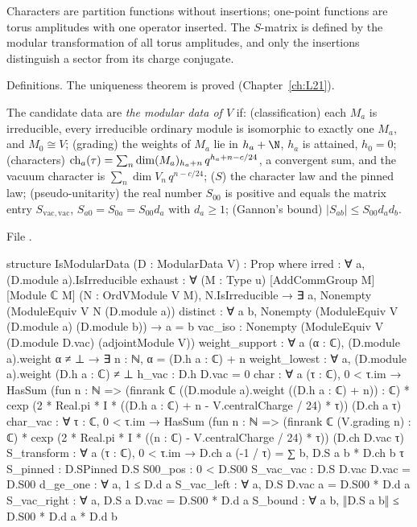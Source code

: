\begin{physics}
Characters are partition functions without insertions; one-point functions are torus amplitudes with one
operator inserted. The $S$-matrix is defined by the modular transformation of all torus amplitudes, and only
the insertions distinguish a sector from its charge conjugate.
\end{physics}

\begin{status}
Definitions. The uniqueness theorem is proved (Chapter~\ref{ch:L21}).
\end{status}

\begin{definition}\label{l22:def:ismoddata}
The candidate data are \emph{the modular data of $V$} if: (classification) each $M_a$ is irreducible, every
irreducible ordinary module is isomorphic to exactly one $M_a$, and $M_0\cong V$; (grading) the weights of $M_a$
lie in $h_a+\N$, $h_a$ is attained, $h_0=0$; (characters) $\operatorname{ch}_a(\tau)=\sum_n \dim(M_a)_{h_a+n}\,
q^{h_a+n-c/24}$, a convergent sum, and the vacuum character is $\sum_n\dim V_n\,q^{n-c/24}$; ($S$) the
character law and the pinned law; (pseudo-unitarity) the real number $S_{00}$ is positive and equals the matrix entry $S_{\mathrm{vac},\mathrm{vac}}$,
$S_{a0}=S_{0a}=S_{00}d_a$ with
$d_a\ge1$; (Gannon's bound) $|S_{ab}|\le S_{00}d_ad_b$.
\end{definition}
\noindent File .
\begin{leancode}
structure IsModularData (D : ModularData V) : Prop where
  irred : ∀ a, (D.module a).IsIrreducible
  exhaust : ∀ (M : Type u) [AddCommGroup M] [Module ℂ M] (N : OrdVModule V M),
    N.IsIrreducible → ∃ a, Nonempty (ModuleEquiv V N (D.module a))
  distinct : ∀ a b, Nonempty (ModuleEquiv V (D.module a) (D.module b)) → a = b
  vac_iso : Nonempty (ModuleEquiv V (D.module D.vac) (adjointModule V))
  weight_support : ∀ a (α : ℂ), (D.module a).weight α ≠ ⊥ → ∃ n : ℕ, α = (D.h a : ℂ) + n
  weight_lowest : ∀ a, (D.module a).weight (D.h a : ℂ) ≠ ⊥
  h_vac : D.h D.vac = 0
  char : ∀ a (τ : ℂ), 0 < τ.im →
    HasSum (fun n : ℕ => (finrank ℂ ((D.module a).weight ((D.h a : ℂ) + n)) : ℂ) *
      cexp (2 * Real.pi * I * ((D.h a : ℂ) + n - V.centralCharge / 24) * τ)) (D.ch a τ)
  char_vac : ∀ τ : ℂ, 0 < τ.im →
    HasSum (fun n : ℕ => (finrank ℂ (V.grading n) : ℂ) *
      cexp (2 * Real.pi * I * ((n : ℂ) - V.centralCharge / 24) * τ)) (D.ch D.vac τ)
  S_transform : ∀ a (τ : ℂ), 0 < τ.im → D.ch a (-1 / τ) = ∑ b, D.S a b * D.ch b τ
  S_pinned : D.SPinned D.S
  S00_pos : 0 < D.S00
  S_vac_vac : D.S D.vac D.vac = D.S00
  d_ge_one : ∀ a, 1 ≤ D.d a
  S_vac_left : ∀ a, D.S D.vac a = D.S00 * D.d a
  S_vac_right : ∀ a, D.S a D.vac = D.S00 * D.d a
  S_bound : ∀ a b, ‖D.S a b‖ ≤ D.S00 * D.d a * D.d b
\end{leancode}

